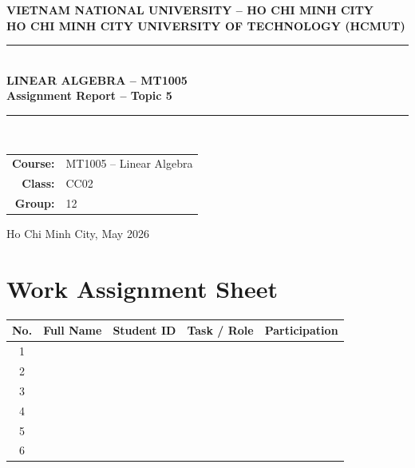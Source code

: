 \documentclass[12pt,a4paper]{article}
\begin{document}

\begin{titlepage}
\thispagestyle{empty}
\centering
{\large \textbf{VIETNAM NATIONAL UNIVERSITY -- HO CHI MINH CITY}}\\[0.2cm]
{\large \textbf{HO CHI MINH CITY UNIVERSITY OF TECHNOLOGY (HCMUT)}}\\[1.5cm]


\rule{\linewidth}{0.6mm}\\[0.4cm]
{\Huge \bfseries LINEAR ALGEBRA -- MT1005}\\[0.4cm]
{\LARGE \bfseries Assignment Report -- Topic 5}\\[0.3cm]
\rule{\linewidth}{0.6mm}\\[2.0cm]

\begin{tabular}{rl}
  \textbf{Course:} & MT1005 -- Linear Algebra \\[0.3em]
  \textbf{Class:}  & CC02                     \\[0.3em]
  \textbf{Group:}  & 12                       \\[0.3em]
\end{tabular}

\vfill
{\large Ho Chi Minh City, May 2026}
\end{titlepage}

\newpage
\thispagestyle{fancy}
\section*{Work Assignment Sheet}

\vspace{0.6cm}
\renewcommand{\arraystretch}{1.6}
\begin{table}[H]
\centering
\begin{tabular}{|c|>{\centering\arraybackslash}m{4cm}|>{\centering\arraybackslash}m{3cm}|>{\centering\arraybackslash}m{4.5cm}|c|}
\hline
\textbf{No.} & \textbf{Full Name} & \textbf{Student ID} & \textbf{Task / Role} & \textbf{Participation} \\
\hline
1 & \rule{0pt}{1.1em} & & & \\ \hline
2 & \rule{0pt}{1.1em} & & & \\ \hline
3 & \rule{0pt}{1.1em} & & & \\ \hline
4 & \rule{0pt}{1.1em} & & & \\ \hline
5 & \rule{0pt}{1.1em} & & & \\ \hline
6 & \rule{0pt}{1.1em} & & & \\ \hline
\end{tabular}
\end{table}
\end{document}
